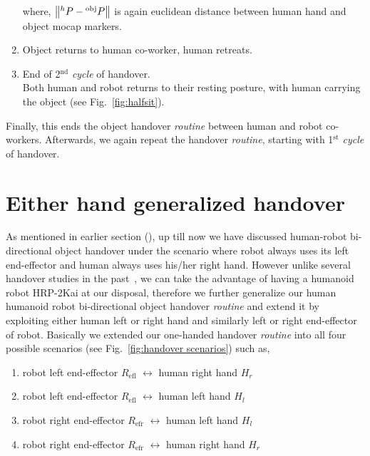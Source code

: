 \begin{enumerate}[start=0,label={\bf{t}\arabic*:}]
    where, $\norm{{}^h{P} - {}^\text{obj}{P}}$ is again euclidean distance between human hand and object mocap markers.

    \item Object returns to human co-worker, human retreats.
    
    \item End of 2$^\text{nd}$ \textit{cycle} of handover.\\
    Both human and robot returns to their resting posture, with human carrying the object (see Fig.~\ref{fig:halfsit}).
    
\end{enumerate}

Finally, this ends the object handover \textit{routine} between human and robot co-workers. Afterwards, we again repeat the handover \textit{routine}, starting with 1$^\text{st}$ \textit{cycle} of handover.



\section{Either hand generalized handover}\label{both hands individual}

As mentioned in earlier section (), up till now we have discussed human-robot bi-directional object handover under the scenario where robot always uses its left end-effector and human always uses his/her right hand. However unlike several handover studies in the past~\cite{cakmak2011human, medina2016human, huber2008Indus, kupcsik2016learning}, we can take the advantage of having a humanoid robot HRP-2Kai at our disposal, therefore we further generalize our human humanoid robot bi-directional object handover \textit{routine} and extend it by exploiting either human left or right hand and similarly left or right end-effector of robot. Basically we extended our one-handed handover \textit{routine} into all four possible scenarios (see Fig.~\ref{fig:handover scenarios}) such as,

\begin{enumerate}
	\item robot left end-effector $R_\text{efl}$ $\longleftrightarrow$ human right hand $H_r$
	\item robot left end-effector $R_\text{efl}$ $\longleftrightarrow$ human left hand $H_l$
	\item robot right end-effector $R_\text{efr}$ $\longleftrightarrow$ human left hand $H_l$
	\item robot right end-effector $R_\text{efr}$ $\longleftrightarrow$ human right hand $H_r$
\end{enumerate}


